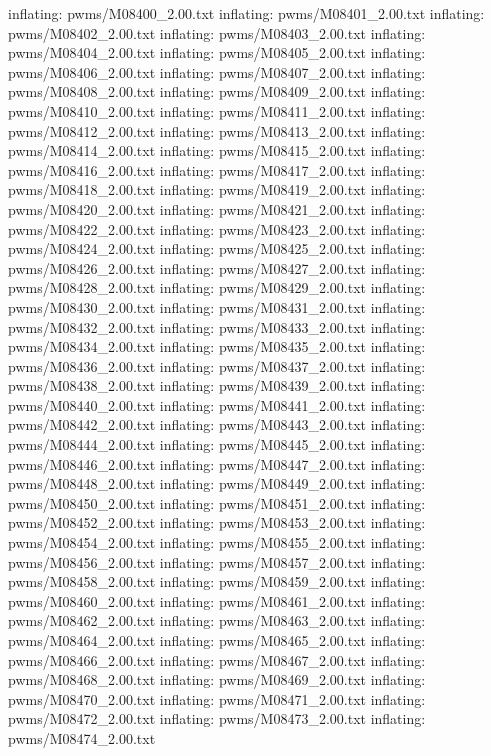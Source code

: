 \documentclass[letterpaper,10pt,english]{sphinxmanual}
\begin{document}
{\begin{sphinxVerbatim}[commandchars=\\\{\}]
  inflating: pwms/M08400\_2.00.txt
  inflating: pwms/M08401\_2.00.txt
  inflating: pwms/M08402\_2.00.txt
  inflating: pwms/M08403\_2.00.txt
  inflating: pwms/M08404\_2.00.txt
  inflating: pwms/M08405\_2.00.txt
  inflating: pwms/M08406\_2.00.txt
  inflating: pwms/M08407\_2.00.txt
  inflating: pwms/M08408\_2.00.txt
  inflating: pwms/M08409\_2.00.txt
  inflating: pwms/M08410\_2.00.txt
  inflating: pwms/M08411\_2.00.txt
  inflating: pwms/M08412\_2.00.txt
  inflating: pwms/M08413\_2.00.txt
  inflating: pwms/M08414\_2.00.txt
  inflating: pwms/M08415\_2.00.txt
  inflating: pwms/M08416\_2.00.txt
  inflating: pwms/M08417\_2.00.txt
  inflating: pwms/M08418\_2.00.txt
  inflating: pwms/M08419\_2.00.txt
  inflating: pwms/M08420\_2.00.txt
  inflating: pwms/M08421\_2.00.txt
  inflating: pwms/M08422\_2.00.txt
  inflating: pwms/M08423\_2.00.txt
  inflating: pwms/M08424\_2.00.txt
  inflating: pwms/M08425\_2.00.txt
  inflating: pwms/M08426\_2.00.txt
  inflating: pwms/M08427\_2.00.txt
  inflating: pwms/M08428\_2.00.txt
  inflating: pwms/M08429\_2.00.txt
  inflating: pwms/M08430\_2.00.txt
  inflating: pwms/M08431\_2.00.txt
  inflating: pwms/M08432\_2.00.txt
  inflating: pwms/M08433\_2.00.txt
  inflating: pwms/M08434\_2.00.txt
  inflating: pwms/M08435\_2.00.txt
  inflating: pwms/M08436\_2.00.txt
  inflating: pwms/M08437\_2.00.txt
  inflating: pwms/M08438\_2.00.txt
  inflating: pwms/M08439\_2.00.txt
  inflating: pwms/M08440\_2.00.txt
  inflating: pwms/M08441\_2.00.txt
  inflating: pwms/M08442\_2.00.txt
  inflating: pwms/M08443\_2.00.txt
  inflating: pwms/M08444\_2.00.txt
  inflating: pwms/M08445\_2.00.txt
  inflating: pwms/M08446\_2.00.txt
  inflating: pwms/M08447\_2.00.txt
  inflating: pwms/M08448\_2.00.txt
  inflating: pwms/M08449\_2.00.txt
  inflating: pwms/M08450\_2.00.txt
  inflating: pwms/M08451\_2.00.txt
  inflating: pwms/M08452\_2.00.txt
  inflating: pwms/M08453\_2.00.txt
  inflating: pwms/M08454\_2.00.txt
  inflating: pwms/M08455\_2.00.txt
  inflating: pwms/M08456\_2.00.txt
  inflating: pwms/M08457\_2.00.txt
  inflating: pwms/M08458\_2.00.txt
  inflating: pwms/M08459\_2.00.txt
  inflating: pwms/M08460\_2.00.txt
  inflating: pwms/M08461\_2.00.txt
  inflating: pwms/M08462\_2.00.txt
  inflating: pwms/M08463\_2.00.txt
  inflating: pwms/M08464\_2.00.txt
  inflating: pwms/M08465\_2.00.txt
  inflating: pwms/M08466\_2.00.txt
  inflating: pwms/M08467\_2.00.txt
  inflating: pwms/M08468\_2.00.txt
  inflating: pwms/M08469\_2.00.txt
  inflating: pwms/M08470\_2.00.txt
  inflating: pwms/M08471\_2.00.txt
  inflating: pwms/M08472\_2.00.txt
  inflating: pwms/M08473\_2.00.txt
  inflating: pwms/M08474\_2.00.txt

\end{sphinxVerbatim}}
\end{document}
